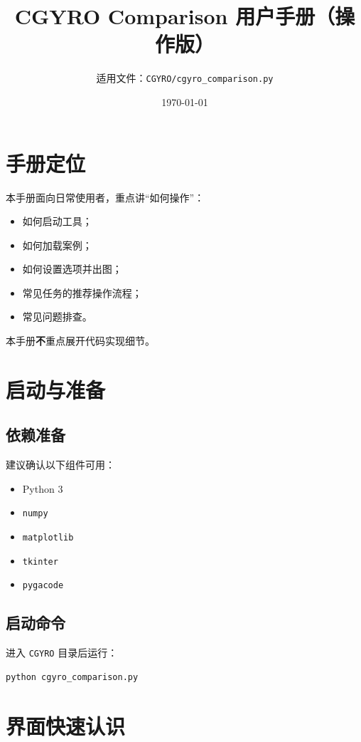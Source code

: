 \documentclass[11pt,a4paper]{ctexart}
\title{CGYRO Comparison 用户手册（操作版）}
\author{适用文件：\texttt{CGYRO/cgyro\_comparison.py}}
\date{\today}
\begin{document}
\maketitle
\tableofcontents
\newpage

\section{手册定位}
本手册面向日常使用者，重点讲“如何操作”：
\begin{itemize}
  \item 如何启动工具；
  \item 如何加载案例；
  \item 如何设置选项并出图；
  \item 常见任务的推荐操作流程；
  \item 常见问题排查。
\end{itemize}
本手册\textbf{不}重点展开代码实现细节。

\section{启动与准备}
\subsection{依赖准备}
建议确认以下组件可用：
\begin{itemize}
  \item Python 3
  \item \texttt{numpy}
  \item \texttt{matplotlib}
  \item \texttt{tkinter}
  \item \texttt{pygacode}
\end{itemize}

\subsection{启动命令}
进入 \texttt{CGYRO} 目录后运行：
\begin{lstlisting}
python cgyro_comparison.py
\end{lstlisting}

\section{界面快速认识}
\end{document}
